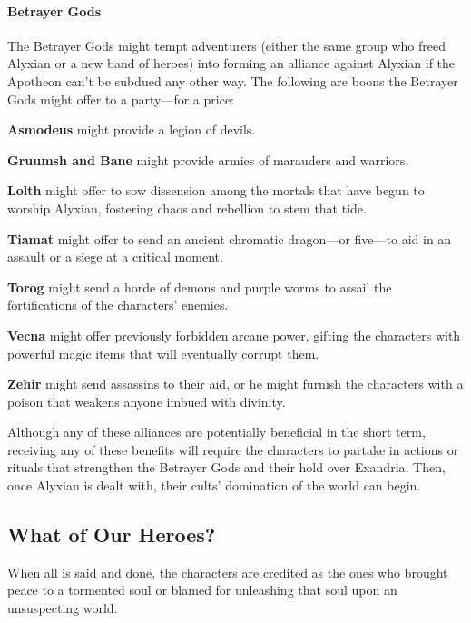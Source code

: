 \documentclass[a4paper, 11pt, bg=full, twocolumn, nooutline]{dndbook}
\begin{document}

\paragraph{Betrayer Gods}

The Betrayer Gods might tempt adventurers (either the same group who freed Alyxian or a new band of heroes) into forming an alliance against Alyxian if the Apotheon can't be subdued any other way. The following are boons the Betrayer Gods might offer to a party---for a price:

\textbf{Asmodeus} might provide a legion of devils.

\textbf{Gruumsh and Bane} might provide armies of marauders and warriors.

\textbf{Lolth} might offer to sow dissension among the mortals that have begun to worship Alyxian, fostering chaos and rebellion to stem that tide.

\textbf{Tiamat} might offer to send an ancient chromatic dragon---or five---to aid in an assault or a siege at a critical moment.

\textbf{Torog} might send a horde of demons and purple worms to assail the fortifications of the characters' enemies.

\textbf{Vecna} might offer previously forbidden arcane power, gifting the characters with powerful magic items that will eventually corrupt them.

\textbf{Zehir} might send assassins to their aid, or he might furnish the characters with a poison that weakens anyone imbued with divinity.

Although any of these alliances are potentially beneficial in the short term, receiving any of these benefits will require the characters to partake in actions or rituals that strengthen the Betrayer Gods and their hold over Exandria. Then, once Alyxian is dealt with, their cults' domination of the world can begin.

\subsection{What of Our Heroes?}

When all is said and done, the characters are credited as the ones who brought peace to a tormented soul or blamed for unleashing that soul upon an unsuspecting world.
\end{document}
